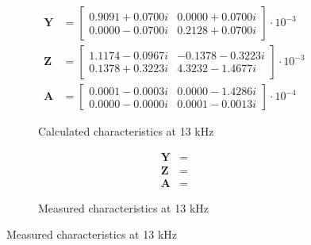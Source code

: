 \documentclass[notitlepage, a4paper, 11pt]{article}
\begin{document}
		\begin{figure}[H]
		\begin{subfigure}{0.45\textwidth}
			\begin{align*}
				\mathbf{Y} &= 
				\begin{bmatrix}
					0.9091 + 0.0700i  & 0.0000 + 0.0700i \\
					0.0000 - 0.0700i  & 0.2128 + 0.0700i
				\end{bmatrix}
				\cdot 10^{-3}
				\\
				\mathbf{Z} &= 
				\begin{bmatrix}
					1.1174 - 0.0967i & -0.1378 - 0.3223i \\
					0.1378 + 0.3223i & 4.3232 - 1.4677i
				\end{bmatrix}
				\cdot 10^{-3}
				\\
				\mathbf{A} &= 
				\begin{bmatrix}
					0.0001 - 0.0003i & 0.0000 - 1.4286i \\
					0.0000 - 0.0000i & 0.0001 - 0.0013i
				\end{bmatrix}
				\cdot 10^{-4}
			\end{align*}
			\caption{Calculated characteristics at 13 kHz}
		\end{subfigure}
		\hfill
		\begin{subfigure}{0.45\textwidth}
			\begin{align*}
				\mathbf{Y} &= 
				\\
				\mathbf{Z} &= 		
				\\
				\mathbf{A} &= 
			\end{align*}
			\caption{Measured characteristics at 13 kHz}
		\end{subfigure}
		

\end{figure}
\end{document}
